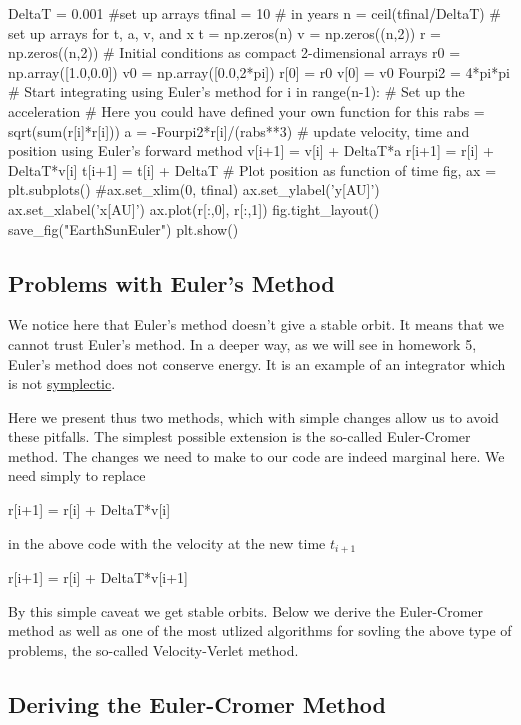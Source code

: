 \documentclass[%
oneside,                 %
final,                   %
10pt]{article}
\begin{document}
DeltaT = 0.001
#set up arrays 
tfinal = 10 # in years
n = ceil(tfinal/DeltaT)
# set up arrays for t, a, v, and x
t = np.zeros(n)
v = np.zeros((n,2))
r = np.zeros((n,2))
# Initial conditions as compact 2-dimensional arrays
r0 = np.array([1.0,0.0])
v0 = np.array([0.0,2*pi])
r[0] = r0
v[0] = v0
Fourpi2 = 4*pi*pi
# Start integrating using Euler's method
for i in range(n-1):
    # Set up the acceleration
    # Here you could have defined your own function for this
    rabs = sqrt(sum(r[i]*r[i]))
    a =  -Fourpi2*r[i]/(rabs**3)
    # update velocity, time and position using Euler's forward method
    v[i+1] = v[i] + DeltaT*a
    r[i+1] = r[i] + DeltaT*v[i]
    t[i+1] = t[i] + DeltaT
# Plot position as function of time    
fig, ax = plt.subplots()
#ax.set_xlim(0, tfinal)
ax.set_ylabel('y[AU]')
ax.set_xlabel('x[AU]')
ax.plot(r[:,0], r[:,1])
fig.tight_layout()
save_fig("EarthSunEuler")
plt.show()

\epycod


\subsection{Problems with Euler's Method}

We notice here that Euler's method doesn't give a stable orbit. It
means that we cannot trust Euler's method. In a deeper way, as we will
see in homework 5, Euler's method does not conserve energy. It is an
example of an integrator which is not
\href{{https://en.wikipedia.org/wiki/Symplectic_integrator}}{symplectic}.

Here we present thus two methods, which with simple changes allow us to avoid these pitfalls. The simplest possible extension is the so-called Euler-Cromer method.
The changes we need to make to our code are indeed marginal here.
We need simply to replace


\bpycod
    r[i+1] = r[i] + DeltaT*v[i]

\epycod

in the above code with the velocity at the new time $t_{i+1}$


\bpycod
    r[i+1] = r[i] + DeltaT*v[i+1]

\epycod


By this simple caveat we get stable orbits.
Below we derive the Euler-Cromer method as well as one of the most utlized algorithms for sovling the above type of problems, the so-called Velocity-Verlet method. 

\subsection{Deriving the Euler-Cromer Method}
\end{document}
